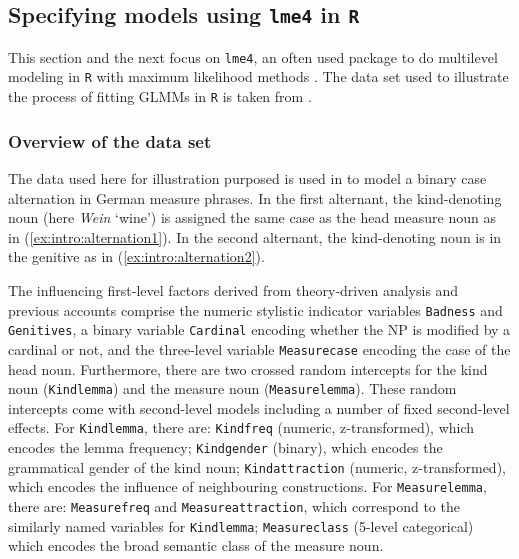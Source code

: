 \subsection{Specifying models using \texttt{lme4} in \texttt{R}}
\label{sec:specifyingmodelsusinglme4inr}

This section and the next focus on \texttt{lme4}, an often used package to do multilevel modeling in \texttt{R} with maximum likelihood methods \citep{BatesEa2015}.
The data set used to illustrate the process of fitting GLMMs in \texttt{R} is taken from \citet{Schaefer2018}.

\subsubsection{Overview of the data set}

The data used here for illustration purposed is used in \citet{Schaefer2018} to model a binary case alternation in German measure phrases.
In the first alternant, the kind-denoting noun (here \textit{Wein} `wine') is assigned the same case as the head measure noun as in (\ref{ex:intro:alternation1}).
In the second alternant, the kind-denoting noun is in the genitive as in (\ref{ex:intro:alternation2}).

\begin{exe}
  \ex\label{ex:intro:alternation}
  \begin{xlist}
  \end{xlist}
\end{exe}

The influencing first-level factors derived from theory-driven analysis and previous accounts comprise the numeric stylistic indicator variables \texttt{Badness} and \texttt{Genitives}, a binary variable \texttt{Cardinal} encoding whether the NP is modified by a cardinal or not, and the three-level variable \texttt{Measurecase} encoding the case of the head noun.
Furthermore, there are two crossed random intercepts for the kind noun (\texttt{Kindlemma}) and the measure noun (\texttt{Measurelemma}).
These random intercepts come with second-level models including a number of fixed second-level effects.
For \texttt{Kindlemma}, there are: \texttt{Kindfreq} (numeric, z-transformed), which encodes the lemma frequency; \texttt{Kindgender} (binary), which encodes the grammatical gender of the kind noun; \texttt{Kindattraction} (numeric, z-transformed), which encodes the influence of neighbouring constructions.
For \texttt{Measurelemma}, there are: \texttt{Measurefreq} and \texttt{Measureattraction}, which correspond to the similarly named variables for \texttt{Kindlemma}; \texttt{Measureclass} (5-level categorical) which encodes the broad semantic class of the measure noun.

